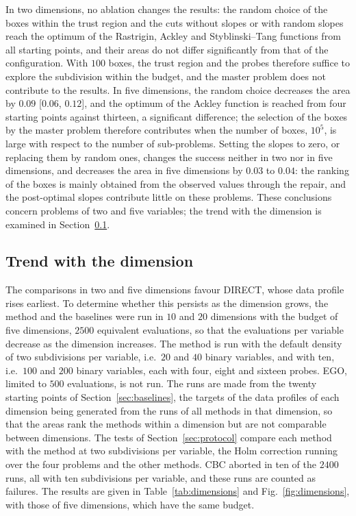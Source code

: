 \documentclass[pdflatex,sn-basic]{sn-jnl}
\begin{document}
In two dimensions, no ablation changes the results: the random choice of the
boxes within the trust region and the cuts without slopes or with random slopes
reach the optimum of the Rastrigin, Ackley and Styblinski--Tang functions from
all starting points, and their areas do not differ significantly from that of
the configuration. With $100$ boxes, the trust region and the probes therefore
suffice to explore the subdivision within the budget, and the master problem
does not contribute to the results. In five dimensions, the random choice
decreases the area by $0.09$ [$0.06$, $0.12$], and the optimum of the Ackley
function is reached from four starting points against thirteen, a significant
difference; the selection of the boxes by the master problem therefore
contributes when the number of boxes, $10^5$, is large with respect to the
number of sub-problems. Setting the slopes to zero, or replacing them by random
ones, changes the success neither in two nor in five dimensions, and decreases
the area in five dimensions by $0.03$ to $0.04$: the ranking of the boxes is
mainly obtained from the observed values through the repair, and the
post-optimal slopes contribute little on these problems. These conclusions
concern problems of two and five variables; the trend with the dimension is
examined in Section~\ref{sec:dimensions}.

\subsection{Trend with the dimension}\label{sec:dimensions}

The comparisons in two and five dimensions favour DIRECT, whose data profile
rises earliest. To determine whether this persists as the dimension grows, the
method and the baselines were run in $10$ and $20$ dimensions with the budget of
five dimensions, $2500$ equivalent evaluations, so that the evaluations per
variable decrease as the dimension increases. The method is run with the default
density of two subdivisions per variable, i.e.\ $20$ and $40$ binary variables,
and with ten, i.e.\ $100$ and $200$ binary variables, each with four, eight
and sixteen probes. EGO, limited to $500$
evaluations, is not run. The runs are made from the twenty starting points of
Section~\ref{sec:baselines}, the targets of the data profiles of each dimension
being generated from the runs of all methods in that dimension, so that the
areas rank the methods within a dimension but are not comparable between
dimensions. The tests of Section~\ref{sec:protocol} compare each method with the
method at two subdivisions per variable, the Holm correction running over the
four problems and the other methods. CBC aborted in ten of the $2400$ runs, all
with ten subdivisions per variable, and these runs are counted as failures. The results are given in
Table~\ref{tab:dimensions} and Fig.~\ref{fig:dimensions}, with those of five
dimensions, which have the same budget.
\end{document}
